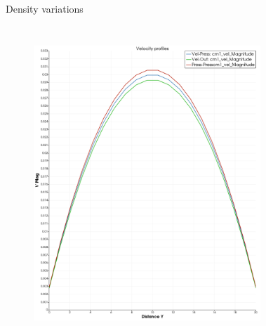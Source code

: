 \documentclass[8pt]{beamer}
\begin{document}
	\begin{frame}{Density variations}
		\begin{columns}
			\begin{figure}
				\centering
				\includegraphics[width=\textwidth]{pics/velDropBox.png}
				\label{}
			\end{figure}
			
			
			\begin{figure}
				\centering
				

\end{figure}
\end{columns}
\end{frame}
\end{document}
